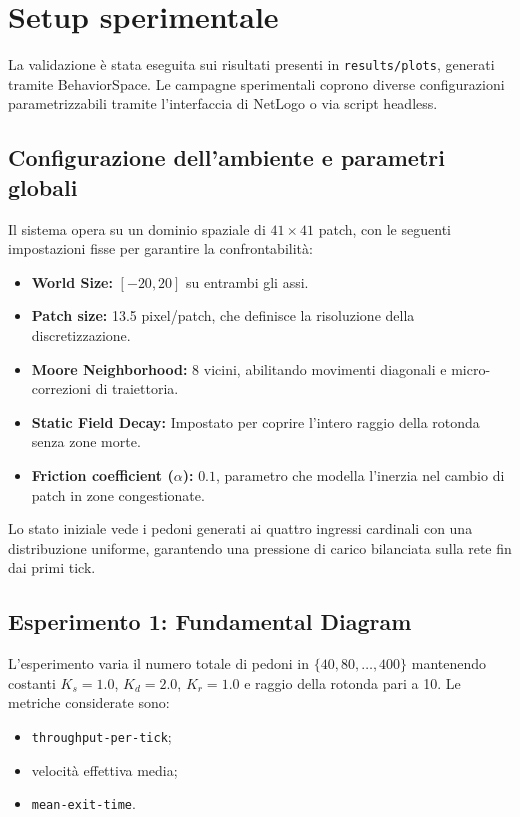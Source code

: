 \section{Setup sperimentale}
La validazione è stata eseguita sui risultati presenti in \texttt{results/plots}, generati tramite BehaviorSpace. Le campagne sperimentali coprono diverse configurazioni parametrizzabili tramite l'interfaccia di NetLogo o via script headless.

\subsection{Configurazione dell'ambiente e parametri globali}
Il sistema opera su un dominio spaziale di $41 \times 41$ patch, con le seguenti impostazioni fisse per garantire la confrontabilità:
\begin{itemize}
    \item \textbf{World Size:} $[-20, 20]$ su entrambi gli assi.
    \item \textbf{Patch size:} 13.5 pixel/patch, che definisce la risoluzione della discretizzazione.
    \item \textbf{Moore Neighborhood:} 8 vicini, abilitando movimenti diagonali e micro-correzioni di traiettoria.
    \item \textbf{Static Field Decay:} Impostato per coprire l'intero raggio della rotonda senza zone morte.
    \item \textbf{Friction coefficient ($\alpha$):} $0.1$, parametro che modella l'inerzia nel cambio di patch in zone congestionate.
\end{itemize}
Lo stato iniziale vede i pedoni generati ai quattro ingressi cardinali con una distribuzione uniforme, garantendo una pressione di carico bilanciata sulla rete fin dai primi tick.

\subsection{Esperimento 1: Fundamental Diagram}
L'esperimento varia il numero totale di pedoni in $\{40,80,\ldots,400\}$ mantenendo costanti $K_s = 1.0$, $K_d = 2.0$, $K_r = 1.0$ e raggio della rotonda pari a 10. Le metriche considerate sono:
\begin{itemize}
\item \texttt{throughput-per-tick};
\item velocità effettiva media;
\item \texttt{mean-exit-time}.
\end{itemize}

